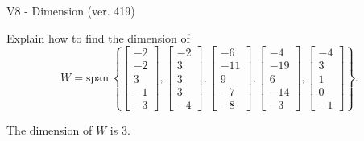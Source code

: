 \begin{exercise}
  \begin{exerciseTitle}V8 - Dimension (ver. 419)\end{exerciseTitle}
  \begin{exerciseStatement}
    Explain how to find the dimension of 
\[W=\mathrm{span}\ \left\{\left[\begin{array}{r}
-2 \\
-2 \\
3 \\
-1 \\
-3
\end{array}\right] , \left[\begin{array}{r}
-2 \\
3 \\
3 \\
3 \\
-4
\end{array}\right] , \left[\begin{array}{r}
-6 \\
-11 \\
9 \\
-7 \\
-8
\end{array}\right] , \left[\begin{array}{r}
-4 \\
-19 \\
6 \\
-14 \\
-3
\end{array}\right] , \left[\begin{array}{r}
-4 \\
3 \\
1 \\
0 \\
-1
\end{array}\right]\right\}.\]



  \end{exerciseStatement}
  \begin{exerciseAnswer}
   The dimension of \(W\) is  \(3\).
  


  \end{exerciseAnswer}
\end{exercise}